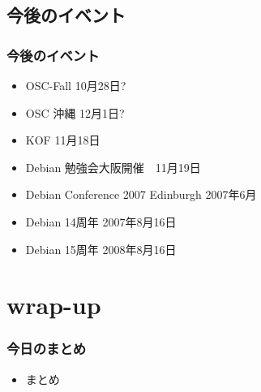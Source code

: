 \documentclass[cjk,dvipdfmx]{beamer}
\begin{document}
\subsection{今後のイベント}

\begin{frame}
 \frametitle{今後のイベント}
 \begin{itemize}
  \item OSC-Fall 10月28日?
  \item OSC 沖縄 12月1日?
  \item KOF 11月18日 
  \item Debian 勉強会大阪開催　11月19日
  \item Debian Conference 2007 Edinburgh 2007年6月
  \item Debian 14周年 2007年8月16日
  \item Debian 15周年 2008年8月16日
 \end{itemize}
\end{frame}

\section{wrap-up}
\begin{frame}
 \frametitle{今日のまとめ}
 \begin{itemize}
  \item まとめ
 \end{itemize}
\end{frame}
\end{document}
